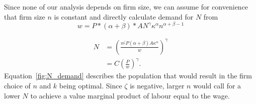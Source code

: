 Since none of our analysis depends on firm size, we can assume for convenience that firm size $n$ is constant and directly calculate demand for $N$ from
\[w  = P*(\alpha+\beta)*AN^\gamma \kappa^\alpha n^{\alpha+\beta-1}  \]

\begin{align}\label{fig:N_demand}
N   &= (\frac{n^\zeta P(\alpha+\beta)A\kappa^\alpha}{w})^\gamma  \nonumber\\
    &= C \left(\frac{P}{w}\right)^\gamma.
\end{align}
Equation~\ref{fig:N_demand} describes the population that would result in the firm choice of $n$ and $k$ being optimal. Since $\zeta$ is negative, larger  $n$ would call for a lower $N$ to achieve a value marginal product of labour equal to the wage.



